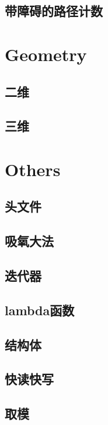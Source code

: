 \documentclass[twocolumn,a4paper]{article}  %
\begin{document}
\subsection{带障碍的路径计数}

\newpage
\section{Geometry}
\subsection{二维}

\subsection{三维}

\newpage
\section{Others}
\subsection{头文件}

\subsection{吸氧大法}

\subsection{迭代器}

\subsection{lambda函数}

\subsection{结构体}

\subsection{快读快写}



\subsection{取模}

\end{document}
